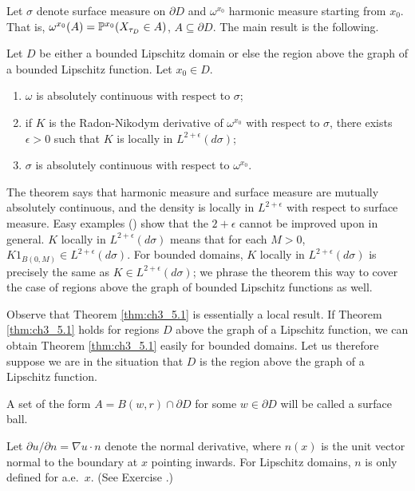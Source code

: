 Let $\sigma$ denote surface measure on $\partial D$ and $\omega^{x_0}$ harmonic measure starting from $x_0$. That is, $\omega^{x_0}(A) = \P^{x_0}(X_{\tau_D} \in A)$, $A \subseteq \partial D$. The main result is the following.

\begin{theorem}\label{thm:ch3_5.1}
Let $D$ be either a bounded Lipschitz domain or else the region above the graph of a bounded Lipschitz function. Let $x_0 \in D$.
\begin{enumerate}
    \item $\omega$ is absolutely continuous with respect to $\sigma$;
    \item if $K$ is the Radon-Nikodym derivative of $\omega^{x_0}$ with respect to $\sigma$, there exists $\epsilon > 0$ such that $K$ is locally in $L^{2+\epsilon}(d\sigma)$;
    \item $\sigma$ is absolutely continuous with respect to $\omega^{x_0}$.
\end{enumerate}
\end{theorem}

\mpagebreak

The theorem says that harmonic measure and surface measure are mutually absolutely continuous, and the density is locally in $L^{2+\epsilon}$ with respect to surface measure. Easy examples (\cite[see][]{Dahlberg1977}) show that the $2+\epsilon$ cannot be improved upon in general. $K$ locally in $L^{2+\epsilon}(d\sigma)$ means that for each $M > 0$, $K1_{B(0,M)} \in L^{2+\epsilon}(d\sigma)$. For bounded domains, $K$ locally in $L^{2+\epsilon}(d\sigma)$ is precisely the same as $K \in L^{2+\epsilon}(d\sigma)$; we phrase the theorem this way to cover the case of regions above the graph of bounded Lipschitz functions as well.

Observe that Theorem \ref{thm:ch3_5.1} is essentially a local result. If Theorem \ref{thm:ch3_5.1} holds for regions $D$ above the graph of a Lipschitz function, we can obtain Theorem \ref{thm:ch3_5.1} easily for bounded domains. Let us therefore suppose we are in the situation that $D$ is the region above the graph of a Lipschitz function.

A set of the form $A = B(w,r) \cap \partial D$ for some $w \in \partial D$ will be called a surface ball.

Let $\partial u/\partial n = \nabla u \cdot n$ denote the normal derivative, where $n(x)$ is the unit vector normal to the boundary at $x$ pointing inwards. For Lipschitz domains, $n$ is only defined for a.e.\ $x$. (See Exercise .)

